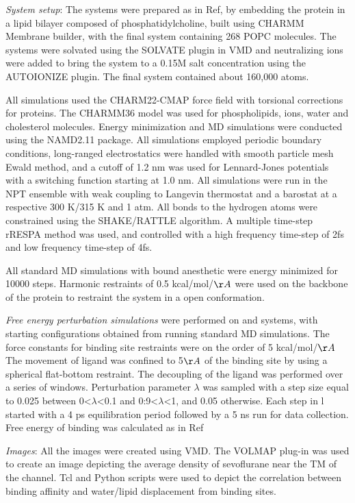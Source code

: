\documentclass{biophys}
\begin{document}
\textit{System setup}: The systems were prepared as in Ref\cite{Henin2014}, by embedding the protein in a lipid bilayer composed of  phosphatidylcholine, built using CHARMM Membrane builder, with the final system containing 268 POPC  molecules. The systems were solvated using the SOLVATE plugin in VMD\cite{Humphrey1996a} and neutralizing ions were added to bring the system to a 0.15M salt concentration using the AUTOIONIZE plugin. The final system contained about 160,000 atoms.

All simulations used the CHARM22-CMAP\cite{MacKerell1998a} force field with torsional corrections for proteins. The CHARMM36 model\cite{Klauda2010,Pitman2004} was used for phospholipids, ions, water and cholesterol molecules. Energy minimization and MD simulations were conducted using the NAMD2.11 package\cite{Phillips2005a}. All simulations employed periodic boundary conditions, long-ranged electrostatics were handled with smooth particle mesh Ewald method, and a cutoff of 1.2 nm was used for Lennard-Jones potentials with a switching function starting at 1.0 nm. All simulations were run in the NPT ensemble with weak coupling to Langevin thermostat and a barostat at a respective 300 K/315 K and 1 atm. All bonds to the hydrogen atoms were constrained using the SHAKE/RATTLE algorithm. A multiple time-step rRESPA method was used, and controlled with a high frequency time-step of 2fs and low frequency time-step of 4fs.

All standard MD simulations with bound anesthetic were energy minimized for 10000 steps. Harmonic restraints of 0.5 kcal/mol/$\AA$ were used on the backbone of the protein to restraint the system in a open conformation.

\textit{Free energy perturbation simulations} were performed on \Ps and \Ss systems, with starting configurations obtained from running standard MD simulations. The force constants for binding site restraints were on the order of 5 kcal/mol/$\AA$ 
The movement of ligand was confined to 5$\AA$ of the binding site by using a spherical flat-bottom restraint. The decoupling of the ligand was performed over a series of windows. Perturbation parameter $\lambda$ was sampled with a step size equal to 0.025 between 0<$\lambda$<0.1 and 0:9<$\lambda$<1, and 0.05 otherwise. Each step in l started with a 4 ps equilibration period followed by a 5 ns run for data collection. Free energy of binding was calculated as in Ref \cite{LeBard2012}

\textit{Images}: All the images were created using VMD\cite{Humphrey1996a}. The VOLMAP plug-in was used to create an image depicting the average density of sevoflurane near the TM of the channel. Tcl and Python scripts were used to depict the correlation between binding affinity and water/lipid displacement from binding sites.
\end{document}
